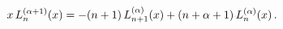 \[x\mathop{L^{(\alpha+1)}_{n}\/}\nolimits\!\left(x\right)=-(n+1)\mathop{L^{(%
\alpha)}_{n+1}\/}\nolimits\!\left(x\right)+(n+\alpha+1)\mathop{L^{(\alpha)}_{n%
}\/}\nolimits\!\left(x\right).\]